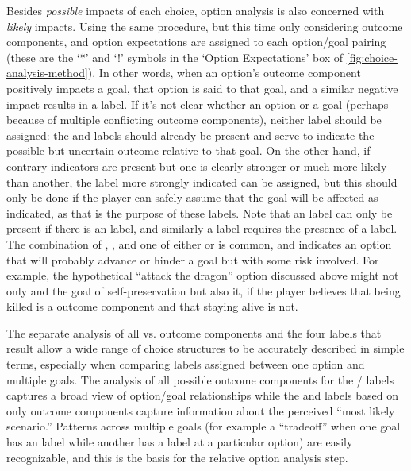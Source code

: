 Besides \emph{possible} impacts of each choice, option analysis is also concerned with \emph{likely} impacts.
%
Using the same procedure, but this time only considering  outcome components,  and  option expectations are assigned to each option/goal pairing (these are the `*' and `!' symbols in the `Option Expectations' box of \cref{fig:choice-analysis-method}).
%
In other words, when an option's  outcome component positively impacts a goal, that option is said to  that goal, and a similar negative impact results in a  label.
%
If it's not clear whether an option  or  a goal (perhaps because of multiple conflicting outcome components), neither label should be assigned: the  and  labels should already be present and serve to indicate the possible but uncertain outcome relative to that goal.
%
On the other hand, if contrary indicators are present but one is clearly stronger or much more likely than another, the label more strongly indicated can be assigned, but this should only be done if the player can safely assume that the goal will be affected as indicated, as that is the purpose of these labels.
%
Note that an  label can only be present if there is an  label, and similarly a  label requires the presence of a  label.
%
The combination of , , and one of either  or  is common, and indicates an option that will probably advance or hinder a goal but with some risk involved.
%
For example, the hypothetical ``attack the dragon'' option discussed above might not only  and  the goal of self-preservation but also  it, if the player believes that being killed is a  outcome component and that staying alive is not.


The separate analysis of all vs\@.  outcome components and the four labels that result allow a wide range of choice structures to be accurately described in simple terms, especially when comparing labels assigned between one option and multiple goals.
%
The analysis of all possible outcome components for the / labels captures a broad view of option/goal relationships while the  and  labels based on only  outcome components capture information about the perceived ``most likely scenario.''
%
Patterns across multiple goals (for example a ``tradeoff'' when one goal has an  label while another has a  label at a particular option) are easily recognizable, and this is the basis for the relative option analysis step.


